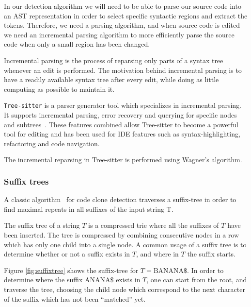 In our detection algorithm we will need to be able to parse our source code into an AST
representation in order to select specific syntactic regions and extract the tokens.
Therefore, we need a parsing algorithm, and when source code is edited we need an
incremental parsing algorithm to more efficiently parse the source code when only a
small region has been changed.

Incremental parsing is the process of reparsing only parts of a syntax tree whenever an
edit is performed. The motivation behind incremental parsing is to have a readily
available syntax tree after every edit, while doing as little computing as possible to
maintain it.

\verb|Tree-sitter| is a parser generator tool which specializes in incremental parsing. It
supports incremental parsing, error recovery and querying for specific nodes and
subtrees~\cite{treesitter}. These features combined allow Tree-sitter to become a powerful
tool for editing and has been used for IDE features such as syntax-highlighting,
refactoring and code navigation.

The incremental reparsing in Tree-sitter is performed using Wagner's
algorithm\cite{PracticalAlgorithmsForIncremental}.


\subsubsection{Suffix trees}

A classic algorithm~\cite{Zibran_real_time_search, GodeIncrementalCloneDetection} for code
clone detection traverses a suffix-tree in order to find maximal repeats in all suffixes
of the input string T.

The suffix tree of a string $T$ is a compressed trie where all the suffixes of $T$ have been
inserted. The tree is compressed by combining consecutive nodes in a row which has
only one child into a single node. A common usage of a suffix tree is to determine whether
or not a suffix exists in $T$, and where in $T$ the suffix starts.

Figure \ref{fig:suffixtree} shows the suffix-tree for $T=\text{BANANA\$}$. In order to
determine where the suffix $\text{ANANA\$}$ exists in $T$, one can start from the root,
and traverse the tree, choosing the child node which correspond to the next character of
the suffix which has not been ``matched'' yet.

